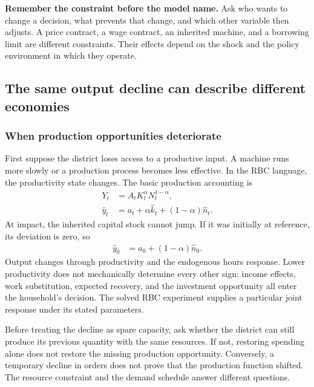 \begin{greenblock}
\textbf{Remember the constraint before the model name.}
Ask who wants to change a decision, what prevents that change, and which other
variable then adjusts. A price contract, a wage contract, an inherited machine,
and a borrowing limit are different constraints. Their effects depend on the
shock and the policy environment in which they operate.
\end{greenblock}

\subsection{The same output decline can describe different economies}

\subsubsection{When production opportunities deteriorate}

First suppose the district loses access to a productive input. A machine runs
more slowly or a production process becomes less effective. In the RBC language,
the productivity state changes. The basic production accounting is
\begin{align}
 Y_t&=A_tK_t^{\alpha}N_t^{1-\alpha},\\
 \hat y_t&=a_t+\alpha\hat k_t+(1-\alpha)\hat n_t.
\end{align}
At impact, the inherited capital stock cannot jump. If it was initially at
reference, its deviation is zero, so
\begin{align}
 \hat y_0&=a_0+(1-\alpha)\hat n_0.
\end{align}
Output changes through productivity and the endogenous hours response. Lower
productivity does not mechanically determine every other sign: income effects,
work substitution, expected recovery, and the investment opportunity all enter
the household's decision. The solved RBC experiment supplies a particular
joint response under its stated parameters.

Before treating the decline as spare capacity, ask whether the district can
still produce its previous quantity with the same resources. If not, restoring
spending alone does not restore the missing production opportunity. Conversely,
a temporary decline in orders does not prove that the production function
shifted. The resource constraint and the demand schedule answer different
questions.

